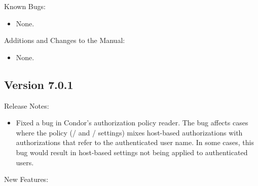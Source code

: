 \noindent Known Bugs:

\begin{itemize}

\item None.

\end{itemize}

\noindent Additions and Changes to the Manual:

\begin{itemize}

\item None.

\end{itemize}


\subsection*{\label{sec:New-7-0-1}Version 7.0.1}

\noindent Release Notes:

\begin{itemize}

\item Fixed a bug in Condor's authorization policy reader.  The bug
affects cases where the policy (/ and
/ settings) mixes host-based
authorizations with authorizations that refer to the authenticated
user name.  In some cases, this bug would result in host-based
settings not being applied to authenticated users.

\end{itemize}

\noindent New Features:

